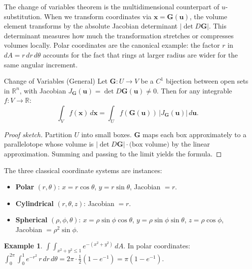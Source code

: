 \documentclass[12pt, openany]{book}
\theoremstyle{plain}
\theoremstyle{definition}
\newtheorem{example}[theorem]{Example}
\theoremstyle{remark}
\newcommand{\R}{\mathbb{R}}
\begin{document}
The change of variables theorem is the multidimensional counterpart of $u$-substitution.  When we transform coordinates via $\mathbf{x} = \mathbf{G}(\mathbf{u})$, the volume element transforms by the absolute Jacobian determinant $|\det D\mathbf{G}|$.  This determinant measures how much the transformation stretches or compresses volumes locally.  Polar coordinates are the canonical example: the factor $r$ in $dA = r\,dr\,d\theta$ accounts for the fact that rings at larger radius are wider for the same angular increment.

\begin{thmbox}{Change of Variables (General)}
Let $\mathbf{G}:U\to V$ be a $C^1$ bijection between open sets in $\R^n$,
with Jacobian $J_\mathbf{G}(\mathbf{u})=\det D\mathbf{G}(\mathbf{u})\neq 0$.
Then for any integrable $f:V\to\R$:
\[\int_V f(\mathbf{x})\,d\mathbf{x}
  = \int_U f(\mathbf{G}(\mathbf{u}))\,|J_\mathbf{G}(\mathbf{u})|\,d\mathbf{u}.\]
\end{thmbox}
\color{black}

\begin{proof}[Proof sketch]
Partition $U$ into small boxes.  $\mathbf{G}$ maps each box approximately to a
parallelotope whose volume is $|\det D\mathbf{G}|\cdot\text{(box volume)}$ by the
linear approximation.  Summing and passing to the limit yields the formula.
\end{proof}

The three classical coordinate systems are instances:

\begin{itemize}[noitemsep]
  \item \textbf{Polar} $(r,\theta)$: $x=r\cos\theta$, $y=r\sin\theta$, Jacobian $=r$.
  \item \textbf{Cylindrical} $(r,\theta,z)$: Jacobian $=r$.
  \item \textbf{Spherical} $(\rho,\phi,\theta)$: $x=\rho\sin\phi\cos\theta$,
        $y=\rho\sin\phi\sin\theta$, $z=\rho\cos\phi$, Jacobian $=\rho^2\sin\phi$.
\end{itemize}

\begin{example}
$\int\!\!\int_{x^2+y^2\leq 1} e^{-(x^2+y^2)}\,dA$.
In polar coordinates: $\int_0^{2\pi}\!\!\int_0^1 e^{-r^2}\,r\,dr\,d\theta
=2\pi\cdot\tfrac{1}{2}(1-e^{-1})=\pi(1-e^{-1})$.
\end{example}
\end{document}
